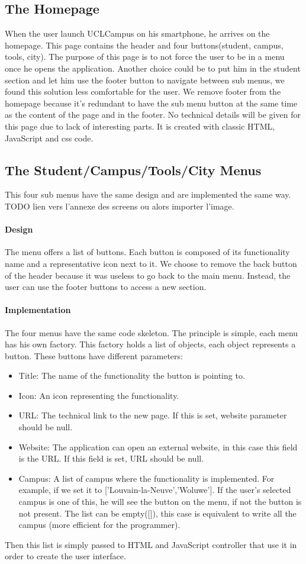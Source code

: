 \documentclass[11pt, a4paper]{report}
\begin{document}
\subsection{The Homepage}
When the user launch UCLCampus on his smartphone, he arrives on the homepage. This page contains the header and four buttons(student, campus, tools, city). The purpose of this page is to not force the user to be in a menu once he opens the application. Another choice could be to put him in the student section and let him use the footer button to navigate between sub menus, we found this solution less comfortable for the user. We remove footer from the homepage because it's redundant to have the sub menu button at the same time as the content of the page and in the footer. No technical details will be given for this page due to lack of interesting parts. It is created with classic HTML, JavaScript and css code.
\subsection{The Student/Campus/Tools/City Menus}
This four sub menus have the same design and are implemented the same way.
TODO lien vers l'annexe des screens ou alors importer l'image. 
\paragraph{Design}
The menu offers a list of buttons. Each button is composed of its functionality name and a representative icon next to it. We choose to remove the back button of the header because it was useless to go back to the main menu. Instead, the user can use the footer buttons to access a new section. 
\paragraph{Implementation}
The four menus have the same code skeleton. The principle is simple, each menu has his own factory. This factory holds a list of objects, each object represents a button. These buttons have different parameters: 
\begin{itemize}
\item Title: The name of the functionality the button is pointing to.
\item Icon: An icon representing the functionality.
\item URL: The technical link to the new page. If this is set, website parameter should be null.
\item Website: The application can open an external website, in this case this field is the URL. If this field is set, URL should be null.
\item Campus: A list of campus where the functionality is implemented. For example, if we set it to ['Louvain-la-Neuve','Woluwe']. If the user's selected campus is one of this, he will see the button on the menu, if not the button is not present. The list can be empty([]), this case is equivalent to write all the campus (more efficient for the programmer). 
\end{itemize}
Then this list is simply passed to HTML and JavaScript controller that use it in order to create the user interface.
\end{document}
